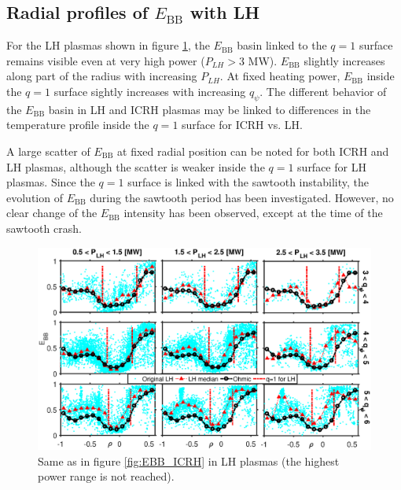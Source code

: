 \subsection{Radial profiles of $E_\mathrm{BB}$ with LH} \label{sec:EBB_LH}

For the LH plasmas shown in figure \ref{fig:EBB_LH}, the $E_\mathrm{BB}$ basin linked to the $q = 1$ surface remains visible even at very high power ($P_{LH}>3$ MW). $E_\mathrm{BB}$ slightly increases along part of the radius with increasing $P_{LH}$. At fixed heating power, $E_\mathrm{BB}$ inside the $q = 1$ surface sightly increases with increasing $q_{\psi}$. The different behavior of the $E_\mathrm{BB}$ basin in LH and ICRH plasmas may be linked to differences in the temperature profile inside the $q = 1$ surface for ICRH vs. LH.

A large scatter of $E_\mathrm{BB}$ at fixed radial position can be noted for both ICRH and LH plasmas, although the scatter is weaker inside the $q = 1$ surface for LH plasmas. Since the $q = 1$ surface is linked with the sawtooth instability, the evolution of $E_\mathrm{BB}$ during the sawtooth period has been investigated. However, no clear change of the $E_\mathrm{BB}$ intensity has been observed, except at the time of the sawtooth crash.




\begin{figure}[h]
\begin{centering}
\includegraphics[scale=0.5]{fig_EBB_LH.eps}
\par\end{centering}
\caption{Same as in figure \ref{fig:EBB_ICRH} in LH plasmas (the highest power range is not reached).}
\label{fig:EBB_LH}
\end{figure}


